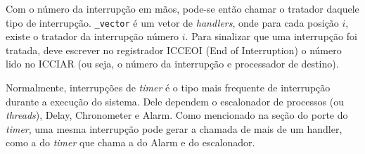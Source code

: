 \documentclass{ufscThesis/ufscThesis} %
\begin{document}
Com o número da interrupção em mãos, pode-se então chamar o tratador daquele tipo de interrupção. \verb+_vector+ é um vetor de \emph{handlers}, onde para cada posição $i$, existe o tratador da interrupção número $i$. Para sinalizar que uma interrupção foi tratada, deve escrever no registrador ICCEOI (End of Interruption) o número lido no ICCIAR (ou seja, o número da interrupção e processador de destino).


Normalmente, interrupções de \emph{timer} é o tipo mais frequente de interrupção durante a execução do sistema. Dele dependem o escalonador de processos (ou \emph{threads}), Delay, Chronometer e Alarm. Como mencionado na seção do porte do \emph{timer}, uma mesma interrupção pode gerar a chamada de mais de um handler, como a do \emph{timer} que chama a do Alarm e do escalonador.

\subsection{}






\end{document}

